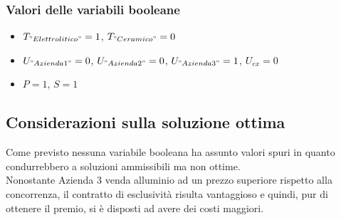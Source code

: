 \documentclass[11pt,a4paper]{article}
\begin{document}
\subsubsection{Valori delle variabili booleane}
\begin{itemize}
\item{$T_{"Elettrolitico"}=1$, $T_{"Ceramico"}=0$}
\item{$U_{"Azienda 1"}=0$, $U_{"Azienda 2"}=0$, $U_{"Azienda 3"}=1$, $U_{ex}=0$}
\item{$P=1$, $S=1$}
\end{itemize}
\subsection{Considerazioni sulla soluzione ottima}
Come previsto nessuna variabile booleana ha assunto valori spuri in quanto condurrebbero a soluzioni ammissibili ma non ottime. \\
Nonostante Azienda 3 venda alluminio ad un prezzo superiore rispetto alla concorrenza, il contratto di esclusività risulta vantaggioso e quindi, pur di ottenere il premio, si è disposti ad avere dei costi maggiori.
\end{document}
